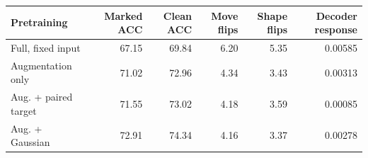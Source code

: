\begin{tabular}{lrrrrr}
\toprule
Pretraining & Marked ACC & Clean ACC & Move flips & Shape flips & Decoder response\\
\midrule
Full, fixed input & 67.15 & 69.84 & 6.20 & 5.35 & 0.00585\\
Augmentation only & 71.02 & 72.96 & 4.34 & 3.43 & 0.00313\\
Aug. + paired target & 71.55 & 73.02 & 4.18 & 3.59 & 0.00085\\
Aug. + Gaussian & 72.91 & 74.34 & 4.16 & 3.37 & 0.00278\\
\bottomrule
\end{tabular}
